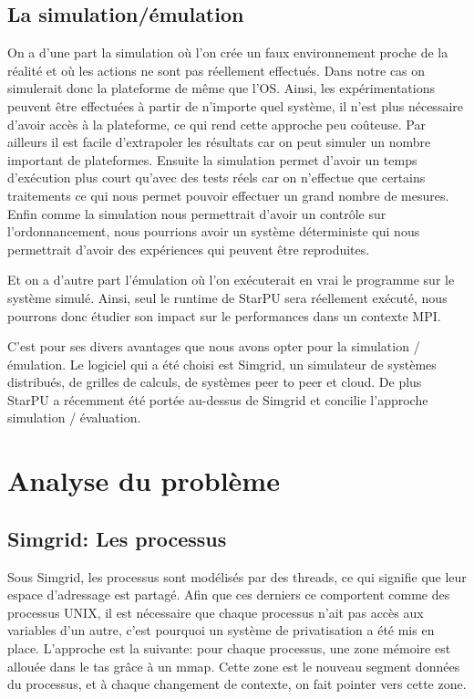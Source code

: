 \documentclass[smallextended]{svjour3}
\begin{document}
\subsection{La simulation/émulation}
\label{sec-2-3}
On a d'une part la simulation où l'on crée un faux environnement
proche de la réalité et où les actions ne sont pas réellement
effectués. Dans notre cas on simulerait donc la plateforme de même que l'OS. 
Ainsi, les expérimentations peuvent être effectuées à partir de
n'importe quel système, il n'est plus nécessaire d'avoir accès à la
plateforme, ce qui rend cette approche peu coûteuse. 
Par ailleurs il est facile d'extrapoler les résultats car on peut
simuler un nombre important de plateformes. Ensuite la simulation
permet d'avoir un temps d'exécution plus court qu'avec des tests
réels car on n'effectue que certains traitements ce qui nous permet
pouvoir effectuer un grand nombre de mesures.  
Enfin comme la simulation nous permettrait d'avoir un contrôle sur
l'ordonnancement, nous pourrions avoir un système déterministe qui
nous permettrait d'avoir des expériences qui peuvent être reproduites.

Et on a d'autre part l'émulation où l'on exécuterait en vrai le
programme sur le système simulé. Ainsi, seul le runtime de StarPU sera
réellement exécuté, nous pourrons donc étudier son impact sur le
performances dans un contexte MPI.

C'est pour ses divers avantages que nous avons opter pour la
simulation / émulation. Le logiciel qui a été choisi est Simgrid, 
un simulateur de systèmes distribués, de grilles de calculs, de
systèmes peer to peer et cloud.
De plus StarPU a récemment été portée au-dessus de Simgrid et
concilie l'approche simulation /  évaluation.

\section{Analyse du problème}
\label{sec-3}
\subsection{Simgrid: Les processus}
\label{sec-3-1}
Sous Simgrid, les processus sont modélisés par des threads, ce
qui signifie que leur espace d'adressage est partagé.
Afin que ces derniers ce comportent comme des processus UNIX, il
est nécessaire que chaque processus n'ait pas accès aux
variables d'un autre, c'est pourquoi un système de
privatisation a été mis en place. L'approche est la suivante:
pour chaque processus, une zone mémoire est allouée dans le
tas grâce à un mmap. Cette zone est le nouveau segment données du
processus, et à chaque changement de contexte, on fait pointer
vers cette zone. 
\end{document}
